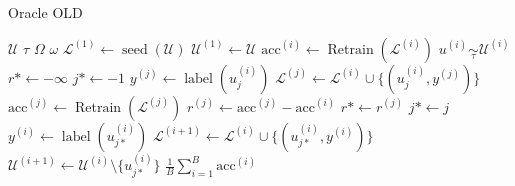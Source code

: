 \documentclass[]{article}
\begin{document}
\begin{algorithm}
	\caption{Oracle {\color{red} OLD}}\label{alg:oracle}
	\begin{algorithmic}[1]
		\Require $\mathcal{U}$ 
		\Require $\tau$ 
		\Require $\Omega$ 
		\Require $\omega$ 
		\State $\mathcal{L}^{(1)} \gets \operatorname{seed}(\mathcal{U})$  
		\State $\mathcal{U}^{(1)} \gets \mathcal{U}$
			\State $\text{acc}^{(i)} \gets \operatorname{Retrain}(\mathcal{L}^{(i)})$  
			\State $u^{(i)} \underset{\tau}{\sim} \mathcal{U}^{(i)}$
			\State $r* \gets -\infty$
			\State $j* \gets -1$
			 
				\State $y^{(j)} \gets \operatorname{label}(u^{(i)}_{j})$
				\State $\mathcal{L}^{(j)} \gets \mathcal{L}^{(i)} \cup \{(u^{(i)}_j, y^{(j)})\}$
				\State $\text{acc}^{(j)} \gets \operatorname{Retrain}(\mathcal{L}^{(j)})$  
				\State $r^{(j)} \gets \text{acc}^{(j)} - \text{acc}^{(i)}$
				 
					\State $r* \gets r^{(j)}$
					\State $j* \gets j$
				\EndIf  
			\EndFor
			\State $y^{(i)} \gets \operatorname{label}(u^{(i)}_{j*})$
			\State $\mathcal{L}^{(i+1)} \gets \mathcal{L}^{(i)} \cup \{(u^{(i)}_{j*}, y^{(i)})\}$
			\State $\mathcal{U}^{(i+1)} \gets \mathcal{U}^{(i)} \setminus \{u^{(i)}_{j*}\}$
		\EndFor
		\State
		\Return $\frac{1}{B} \sum_{i=1}^{B} \text{acc}^{(i)}$
	\end{algorithmic}
\end{algorithm}

\end{document}
